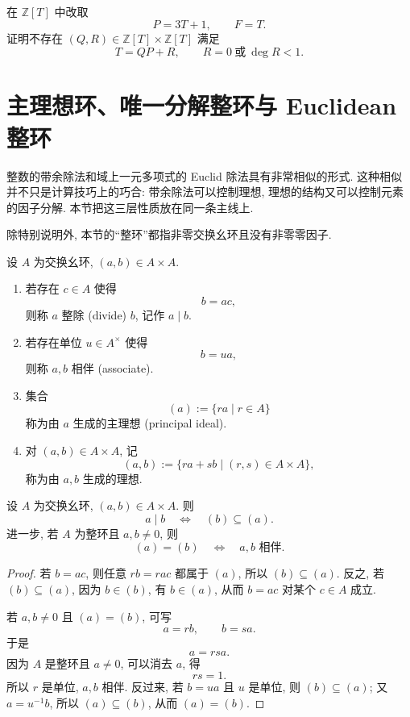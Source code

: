 \documentclass[usesamecnt, thmcnt=section, lang=cn, newtx, 10pt, scheme=chinese]{elegantbook}
\begin{document}
\begin{exercise}\label{ex:alg-division-leading-unit}
在 $\mathbb Z[T]$ 中改取
\[
 P=3T+1,\qquad F=T.
\]
证明不存在 $(Q,R)\in\mathbb Z[T]\times\mathbb Z[T]$ 满足
\[
 T=QP+R,
 \qquad
 R=0\ \text{或}\ \deg R<1.
\]
\end{exercise}

\section{主理想环、唯一分解整环与 Euclidean 整环}

整数的带余除法和域上一元多项式的 Euclid 除法具有非常相似的形式. 这种相似并不只是计算技巧上的巧合: 带余除法可以控制理想, 理想的结构又可以控制元素的因子分解. 本节把这三层性质放在同一条主线上.

除特别说明外, 本节的``整环''都指非零交换幺环且没有非零零因子.

\begin{definition}[整除、相伴与主理想]\label{def:alg-divisibility-principal-ideal}
设 $A$ 为交换幺环, $(a,b)\in A\times A$.
\begin{enumerate}[label=\rm(\arabic*)]
  \item 若存在 $c\in A$ 使得
  \[
   b=ac,
  \]
  则称 $a$ {\color{blue}整除 (divide)} $b$, 记作 $a\mid b$.
  \item 若存在单位 $u\in A^\times$ 使得
  \[
   b=ua,
  \]
  则称 $a,b$ {\color{blue}相伴 (associate)}.
  \item 集合
  \[
   (a):=\{ra\mid r\in A\}
  \]
  称为由 $a$ 生成的{\color{blue}主理想 (principal ideal)}.
  \item 对 $(a,b)\in A\times A$, 记
  \[
   (a,b):=\{ra+sb\mid (r,s)\in A\times A\},
  \]
  称为由 $a,b$ 生成的理想.
\end{enumerate}
\end{definition}

\begin{proposition}\label{prop:alg-divisibility-ideal}
设 $A$ 为交换幺环, $(a,b)\in A\times A$. 则
\[
 a\mid b
 \quad\Longleftrightarrow\quad
 (b)\subseteq(a).
\]
进一步, 若 $A$ 为整环且 $a,b\neq0$, 则
\[
 (a)=(b)
 \quad\Longleftrightarrow\quad
 a,b\text{ 相伴}.
\]
\end{proposition}

\begin{proof}
若 $b=ac$, 则任意 $rb=rac$ 都属于 $(a)$, 所以 $(b)\subseteq(a)$. 反之, 若 $(b)\subseteq(a)$, 因为 $b\in(b)$, 有 $b\in(a)$, 从而 $b=ac$ 对某个 $c\in A$ 成立.

若 $a,b\neq0$ 且 $(a)=(b)$, 可写
\[
 a=rb,\qquad b=sa.
\]
于是
\[
 a=rsa.
\]
因为 $A$ 是整环且 $a\neq0$, 可以消去 $a$, 得
\[
 rs=1.
\]
所以 $r$ 是单位, $a,b$ 相伴. 反过来, 若 $b=ua$ 且 $u$ 是单位, 则 $(b)\subseteq(a)$; 又 $a=u^{-1}b$, 所以 $(a)\subseteq(b)$, 从而 $(a)=(b)$.
\end{proof}
\end{document}
